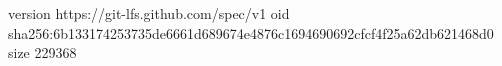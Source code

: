 version https://git-lfs.github.com/spec/v1
oid sha256:6b133174253735de6661d689674e4876c1694690692cfcf4f25a62db621468d0
size 229368
